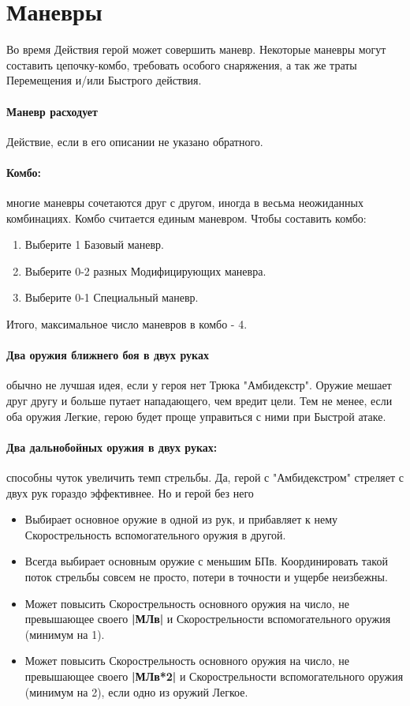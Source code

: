 \section{Маневры}
Во время Действия герой может совершить маневр. Некоторые маневры могут составить цепочку-комбо, требовать особого снаряжения, а так же траты Перемещения и/или Быстрого действия.
\paragraph{Маневр расходует} Действие, если в его описании не указано обратного.
\paragraph{Комбо:} многие маневры сочетаются друг с другом, иногда в весьма неожиданных комбинациях. Комбо считается единым маневром.
Чтобы составить комбо:
\begin{enumerate}
  \item Выберите 1 Базовый маневр.
  \item Выберите 0-2 разных Модифицирующих маневра.
  \item Выберите 0-1 Специальный маневр.
\end{enumerate}
Итого, максимальное число маневров в комбо - 4.

\paragraph{Два оружия ближнего боя в двух руках} обычно не лучшая идея, если у героя нет Трюка "Амбидекстр". Оружие мешает друг другу и больше путает нападающего, чем вредит цели. Тем не менее, если оба оружия Легкие, герою будет проще управиться с ними при Быстрой атаке. 

\paragraph{Два дальнобойных оружия в двух руках:} способны чуток увеличить темп стрельбы. Да, герой с "Амбидекстром" стреляет с двух рук гораздо эффективнее. Но и герой без него
\begin{itemize}
  \item Выбирает основное оружие в одной из рук, и прибавляет к нему Скорострельность вспомогательного оружия в другой.
  \item Всегда выбирает основным оружие с меньшим БПв. Координировать такой поток стрельбы совсем не просто, потери в точности и ущербе неизбежны.
  \item Может повысить Скорострельность основного оружия на число, не превышающее своего \textbf{|МЛв|} и Скорострельности вспомогательного оружия (минимум на 1).
  \item Может повысить Скорострельность основного оружия на число, не превышающее своего \textbf{|МЛв*2|} и Скорострельности вспомогательного оружия (минимум на 2), если одно из оружий Легкое.
\end{itemize}

